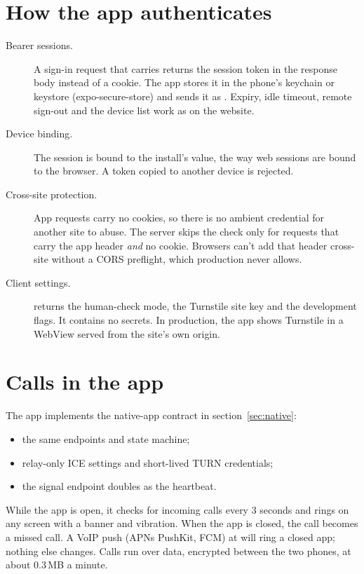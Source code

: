 \section{How the app authenticates}

\begin{description}
  \item[Bearer sessions.] A sign-in request that carries  returns the session token in the response body instead of a cookie. The app stores it in the phone's keychain or keystore (expo-secure-store) and sends it as . Expiry, idle timeout, remote sign-out and the device list work as on the website.
  \item[Device binding.] The session is bound to the install's  value, the way web sessions are bound to the browser. A token copied to another device is rejected.
  \item[Cross-site protection.] App requests carry no cookies, so there is no ambient credential for another site to abuse. The server skips the  check only for requests that carry the app header \emph{and} no cookie. Browsers can't add that header cross-site without a CORS preflight, which production never allows.
  \item[Client settings.]  returns the human-check mode, the Turnstile site key and the development flags. It contains no secrets. In production, the app shows Turnstile in a WebView served from the site's own origin.
\end{description}

\section{Calls in the app}

The app implements the native-app contract in section~\ref{sec:native}:
\begin{itemize}
  \item the same  endpoints and state machine;
  \item relay-only ICE settings and short-lived TURN credentials;
  \item the signal endpoint doubles as the heartbeat.
\end{itemize}
While the app is open, it checks for incoming calls every 3 seconds and rings on any screen with a banner and vibration. When the app is closed, the call becomes a missed call. A VoIP push (APNs PushKit, FCM) at  will ring a closed app; nothing else changes. Calls run over data, encrypted between the two phones, at about 0.3\,MB a minute.

